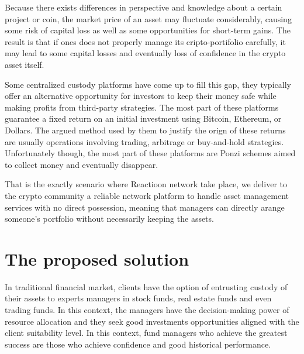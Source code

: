 \documentclass[
	article,			%
	12pt,				%
	oneside,			%
	a4paper,			%
	brazil,				%
	english,
	sumario=tradicional
	]{abntex2}
\begin{document}
Because there exists differences in perspective and knowledge about a certain project or coin, the market price of an asset may fluctuate considerably, causing some risk of capital loss as well as some opportunities for short-term gains. The result is that if ones does not properly manage its cripto-portifolio carefully,  it may lead to some capital losses and eventually loss of confidence in the crypto asset itself.

Some centralized custody platforms have come up to fill this gap, they typically offer an alternative opportunity for investors to keep their money safe while making profits from third-party strategies. The most part of these platforms guarantee a fixed return on an initial investment using Bitcoin, Ethereum, or Dollars. The argued method used by them to justify the orign of these returns are usually operations involving trading, arbitrage or buy-and-hold strategies. Unfortunately though, the most part of these platforms are Ponzi schemes aimed to collect money and eventually disappear.  

That is the exactly scenario where Reactioon network take place, we deliver to the crypto community a reliable network platform to handle asset management services with no direct possession, meaning that managers can directly arange someone's portfolio without necessarily keeping the assets. 






\section{The proposed solution}

In traditional financial market, clients have the option of entrusting custody of their assets to experts managers in stock funds, real estate funds and even trading funds. In this context, the managers have the decision-making power of resource allocation and they seek good investments opportunities aligned with the client suitability level. In this context, fund managers who achieve the greatest success are those who achieve confidence and good historical performance. 
\end{document}
